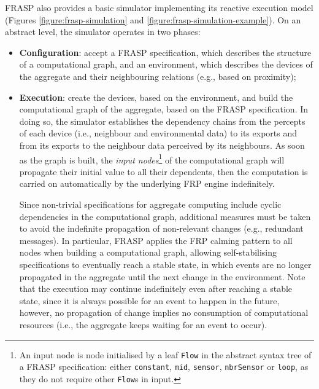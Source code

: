 FRASP also provides a basic simulator implementing its reactive execution model
(Figures \ref{figure:frasp-simulation} and
\ref{figure:frasp-simulation-example}). On an abstract level, the simulator
operates in two phases:
\begin{itemize}
  \item \textbf{Configuration}: accept a FRASP specification, which describes
        the structure of a computational graph, and an environment, which
        describes the devices of the aggregate and their neighbouring relations
        (e.g., based on proximity);
  \item \textbf{Execution}: create the devices, based on the environment, and
        build the computational graph of the aggregate, based on the FRASP
        specification. In doing so, the simulator establishes the dependency
        chains from the percepts of each device (i.e., neighbour and
        environmental data) to its exports and from its exports to the
        neighbour data perceived by its neighbours. As soon as the graph is
        built, the \textit{input nodes}\footnote{
          An input node is node initialised by a leaf \texttt{Flow} in the
          abstract syntax tree of a FRASP specification: either
          \texttt{constant}, \texttt{mid}, \texttt{sensor}, \texttt{nbrSensor}
          or \texttt{loop}, as they do not require other \texttt{Flow}s in
          input.
        } of the computational graph will propagate their initial value to all
        their dependents, then the computation is carried on automatically by
        the underlying \ac{FRP} engine indefinitely.

        Since non-trivial specifications for aggregate computing include cyclic
        dependencies in the computational graph, additional measures must be
        taken to avoid the indefinite propagation of non-relevant changes
        (e.g., redundant messages). In particular, FRASP applies the FRP
        calming pattern to all nodes when building a computational graph,
        allowing self-stabilising specifications to eventually reach a stable
        state, in which events are no longer propagated in the aggregate until
        the next change in the environment. Note that the execution may
        continue indefinitely even after reaching a stable state, since it is
        always possible for an event to happen in the future, however, no
        propagation of change implies no consumption of computational resources
        (i.e., the aggregate keeps waiting for an event to occur).
\end{itemize}

